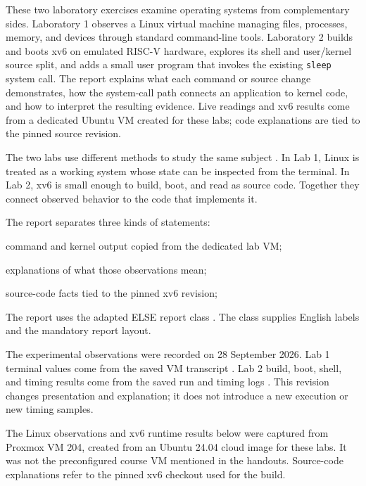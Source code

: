 \documentclass{assets/utmreport}
\begin{document}
\makeutmreporttitlepage
\tableofcontents
\clearpage

\begin{utmabstract}[Abstract]
These two laboratory exercises examine operating systems from complementary sides. Laboratory 1 observes a Linux virtual machine managing files, processes, memory, and devices through standard command-line tools. Laboratory 2 builds and boots xv6 on emulated RISC-V hardware, explores its shell and user/kernel source split, and adds a small user program that invokes the existing \texttt{sleep} system call. The report explains what each command or source change demonstrates, how the system-call path connects an application to kernel code, and how to interpret the resulting evidence. Live readings and xv6 results come from a dedicated Ubuntu VM created for these labs; code explanations are tied to the pinned source revision.

\end{utmabstract}

\utmintroduction
The two labs use different methods to study the same subject \cite{lab1,lab2}. In Lab 1, Linux is treated as a working system whose state can be inspected from the terminal. In Lab 2, xv6 is small enough to build, boot, and read as source code. Together they connect observed behavior to the code that implements it.

The report separates three kinds of statements:
\begin{utmenumerate}
\item command and kernel output copied from the dedicated lab VM;
\item explanations of what those observations mean;
\item source-code facts tied to the pinned xv6 revision;
\end{utmenumerate}

The report uses the adapted ELSE report class \cite{template}. The class supplies English labels and the mandatory report layout.

The experimental observations were recorded on 28 September 2026. Lab 1 terminal values come from the saved VM transcript \cite{lab1evidence}. Lab 2 build, boot, shell, and timing results come from the saved run and timing logs \cite{lab2evidence}. This revision changes presentation and explanation; it does not introduce a new execution or new timing samples.

The Linux observations and xv6 runtime results below were captured from Proxmox VM 204, created from an Ubuntu 24.04 cloud image for these labs. It was not the preconfigured course VM mentioned in the handouts. Source-code explanations refer to the pinned xv6 checkout used for the build.
\end{document}
